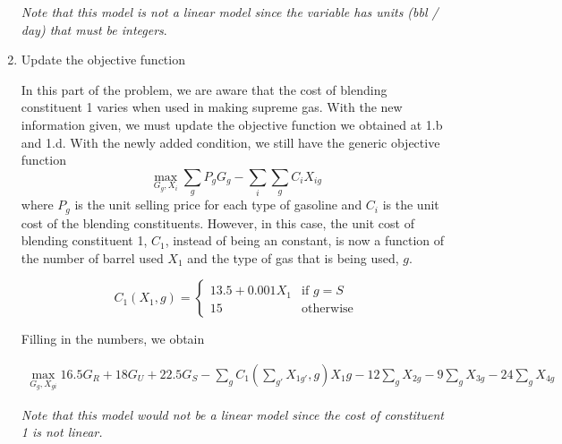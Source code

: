 \documentclass[11pt]{article}
\begin{document}
\begin{enumerate}
\textit{Note that this model is not a linear model since the variable has units (bbl / day) that must be integers}.

\item Update the objective function\par
In this part of the problem, we are aware that the cost of blending constituent 1 varies when used in making supreme gas. With the new information given, we must update the objective function we obtained at 1.b and 1.d. With the newly added condition, we still have the generic objective function
    $$\max_{G_g, X_i} \sum_{g} P_g G_g - \sum_{i} \sum_{g}C_i X_{ig}$$
where $P_g$ is the unit selling price for each type of gasoline and $C_i$ is the unit cost of the blending constituents. However, in this case, the unit cost of blending constituent 1, $C_1$, instead of being an constant, is now a function of the number of barrel used $X_1$ and the type of gas that is being used, $g$.

$$C_1(X_1, g) = 
\begin{cases}
    13.5 + 0.001X_1 & \text{if }  g = S \\ 
    15 & \text{otherwise} 
\end{cases}
$$

Filling in the numbers, we obtain 

\begin{multline*}
\max_{G_g, X_{gi}} 16.5 G_R + 18 G_U + 22.5 G_S - \sum_g C_1(\sum_{g'}{X_{1g'}}, g) X_1g- 12 \sum_g X_{2g} - 9 \sum_g X_{3g} - 24\sum_g X_{4g}
\end{multline*}

\textit{Note that this model would not be a linear model since the cost of constituent 1 is not linear.}


\end{enumerate}
\end{document}
